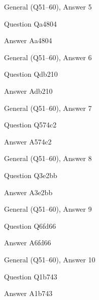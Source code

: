 \documentclass[11pt]{beamer}
\begin{document}
\begin{frame}[t]{General (Q51--60), Answer 5}
\vspace{2em}
\begin{block}{Question}
Qa4804
\end{block}
\pause{}
\begin{block}{Answer}
Aa4804
\end{block}
\end{frame}
    

\begin{frame}[t]{General (Q51--60), Answer 6}
\vspace{2em}
\begin{block}{Question}
Qdb210
\end{block}
\pause{}
\begin{block}{Answer}
Adb210
\end{block}
\end{frame}
    

\begin{frame}[t]{General (Q51--60), Answer 7}
\vspace{2em}
\begin{block}{Question}
Q574c2
\end{block}
\pause{}
\begin{block}{Answer}
A574c2
\end{block}
\end{frame}
    

\begin{frame}[t]{General (Q51--60), Answer 8}
\vspace{2em}
\begin{block}{Question}
Q3e2bb
\end{block}
\pause{}
\begin{block}{Answer}
A3e2bb
\end{block}
\end{frame}
    

\begin{frame}[t]{General (Q51--60), Answer 9}
\vspace{2em}
\begin{block}{Question}
Q6fd66
\end{block}
\pause{}
\begin{block}{Answer}
A6fd66
\end{block}
\end{frame}
    

\begin{frame}[t]{General (Q51--60), Answer 10}
\vspace{2em}
\begin{block}{Question}
Q1b743
\end{block}
\pause{}
\begin{block}{Answer}
A1b743
\end{block}
\end{frame}
    
\end{document}
